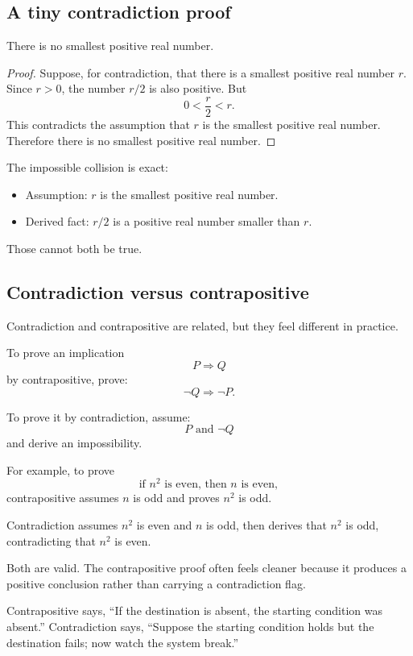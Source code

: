 \subsection{A tiny contradiction proof}

\begin{theorem}
There is no smallest positive real number.
\end{theorem}

\begin{proof}
Suppose, for contradiction, that there is a smallest positive real number $r$. Since $r>0$, the number $r/2$ is also positive. But
\[
0<\frac r2<r.
\]
This contradicts the assumption that $r$ is the smallest positive real number. Therefore there is no smallest positive real number.
\end{proof}

The impossible collision is exact:

\begin{itemize}
\item Assumption: $r$ is the smallest positive real number.
\item Derived fact: $r/2$ is a positive real number smaller than $r$.
\end{itemize}

Those cannot both be true.

\subsection{Contradiction versus contrapositive}

Contradiction and contrapositive are related, but they feel different in practice.

To prove an implication
\[
P\Rightarrow Q
\]
by contrapositive, prove:
\[
\neg Q\Rightarrow\neg P.
\]

To prove it by contradiction, assume:
\[
P\text{ and }\neg Q
\]
and derive an impossibility.

For example, to prove
\[
\text{if }n^2\text{ is even, then }n\text{ is even},
\]
contrapositive assumes $n$ is odd and proves $n^2$ is odd.

Contradiction assumes $n^2$ is even and $n$ is odd, then derives that $n^2$ is odd, contradicting that $n^2$ is even.

Both are valid. The contrapositive proof often feels cleaner because it produces a positive conclusion rather than carrying a contradiction flag.

\begin{intuitionbox}
Contrapositive says, ``If the destination is absent, the starting condition was absent.'' Contradiction says, ``Suppose the starting condition holds but the destination fails; now watch the system break.''
\end{intuitionbox}

